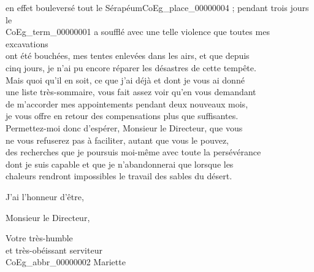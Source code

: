 \documentclass{book}
\begin{document}
en effet bouleversé tout le Sérapéum\gls{CoEg_place_00000004} ; pendant trois jours le\\
\Gls{CoEg_term_00000001} a soufflé avec une telle violence que toutes mes excavations\\
ont été bouchées, mes tentes enlevées dans les airs, et que depuis\\
cinq jours, je n’ai pu encore réparer les désastres de cette tempête.\\
\indent Mais quoi qu’il en soit, ce que j’ai déjà et dont je vous ai donné\\
une liste très-sommaire, vous fait assez voir qu’en vous demandant\\
de m’accorder mes appointements pendant deux nouveaux mois,\\
je vous offre en retour des compensations plus que suffisantes.\\
\indent Permettez-moi donc d’espérer, Monsieur le Directeur, que vous\\
ne vous refuserez pas à faciliter, autant que vous le pouvez,\\
des recherches que je poursuis moi-même avec toute la persévérance\\
dont je suis capable et que je n’abandonnerai que lorsque les\\
chaleurs rendront impossibles le travail des sables du désert.
\par J’ai l’honneur d’être,
\begin{center} Monsieur le Directeur,\end{center}
\begin{center} \hspace{5cm}Votre très-humble\\
\hspace{5cm}et très-obéissant serviteur\\
\hspace{5cm} \gls{CoEg_abbr_00000002} Mariette\end{center}
\end{document}
